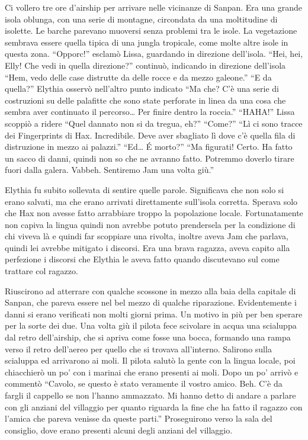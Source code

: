     Ci vollero tre ore d'airship per arrivare nelle vicinanze di Sanpan.
    Era una grande isola oblunga, con una serie di montagne, circondata da
    una moltitudine di isolette. Le barche parevano muoversi senza problemi
    tra le isole. La vegetazione sembrava essere quella tipica di una
    jungla tropicale, come molte altre isole in questa zona. ``Opporc!''
    esclamò Lissa, guardando in direzione dell'isola. ``Hei, hei, Elly! Che
    vedi in quella direzione?'' continuò, indicando in direzione dell'isola
    ``Hem, vedo delle case distrutte da delle rocce e da mezzo galeone.''
    ``E da quella?'' Elythia osservò nell'altro punto indicato ``Ma che?
    C'è una serie di costruzioni su delle palafitte che sono state
    perforate in linea da una cosa che sembra aver continuato il
    percorso\dots{} Per finire dentro la roccia.'' ``HAHA!'' Lissa scoppiò
    a ridere ``Quel dannato non si da tregua, eh?'' ``Come?'' ``Lì ci sono
    tracce dei Fingerprints di Hax. Incredibile. Deve aver sbagliato lì
    dove c'è quella fila di distruzione in mezzo ai palazzi.'' ``Ed\dots{}
    \'E morto?'' ``Ma figurati! Certo. Ha fatto un sacco di danni, quindi
    non so che ne avranno fatto. Potremmo doverlo tirare fuori dalla
    galera. Vabbeh. Sentiremo Jam una volta giù.''

    Elythia fu subito sollevata di sentire quelle parole. Significava che
    non solo si erano salvati, ma che erano arrivati direttamente
    sull'isola corretta. Sperava solo che Hax non avesse fatto arrabbiare
    troppo la popolazione locale. Fortunatamente non capiva la lingua
    quindi non avrebbe potuto prendersela per la condizione di chi viveva
    là e quindi far scoppiare una rivolta, inoltre aveva Jam che parlava,
    quindi lei avrebbe mitigato i discorsi. Era una brava ragazza, aveva
    capito alla perfezione i discorsi che Elythia le aveva fatto quando
    discutevano sul come trattare col ragazzo.

    Riuscirono ad atterrare con qualche scossone in mezzo alla baia della
    capitale di Sanpan, che pareva essere nel bel mezzo di qualche
    riparazione. Evidentemente i danni si erano verificati non molti giorni
    prima. Un motivo in più per ben sperare per la sorte dei due. Una volta
    giù il pilota fece scivolare in acqua una scialuppa dal retro
    dell'airship, che si apriva come fosse una bocca, formando una rampa
    verso il retro dell'aereo per quello che si trovava all'interno.
    Salirono sulla scialuppa ed arrivarono ai moli. Il pilota salutò la
    gente con la lingua locale, poi chiacchierò un po' con i marinai che
    erano presenti ai moli. Dopo un po' arrivò e commentò ``Cavolo, se
    questo è stato veramente il vostro amico. Beh. C'è da fargli il
    cappello se non l'hanno ammazzato. Mi hanno detto di andare a parlare
    con gli anziani del villaggio per quanto riguarda la fine che ha fatto
    il ragazzo con l'amica che pareva venisse da queste parti.''
    Proseguirono verso la sala del consiglio, dove erano presenti alcuni
    degli anziani del villaggio.

